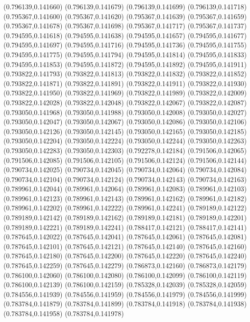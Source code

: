 (0.796139,0.141660)
(0.796139,0.141679)
(0.796139,0.141699)
(0.796139,0.141718)
(0.795367,0.141600)
(0.795367,0.141620)
(0.795367,0.141639)
(0.795367,0.141659)
(0.795367,0.141678)
(0.795367,0.141698)
(0.795367,0.141717)
(0.795367,0.141737)
(0.794595,0.141618)
(0.794595,0.141638)
(0.794595,0.141657)
(0.794595,0.141677)
(0.794595,0.141697)
(0.794595,0.141716)
(0.794595,0.141736)
(0.794595,0.141755)
(0.794595,0.141775)
(0.794595,0.141794)
(0.794595,0.141814)
(0.794595,0.141833)
(0.794595,0.141853)
(0.794595,0.141872)
(0.794595,0.141892)
(0.794595,0.141911)
(0.793822,0.141793)
(0.793822,0.141813)
(0.793822,0.141832)
(0.793822,0.141852)
(0.793822,0.141871)
(0.793822,0.141891)
(0.793822,0.141911)
(0.793822,0.141930)
(0.793822,0.141950)
(0.793822,0.141969)
(0.793822,0.141989)
(0.793822,0.142009)
(0.793822,0.142028)
(0.793822,0.142048)
(0.793822,0.142067)
(0.793822,0.142087)
(0.793050,0.141968)
(0.793050,0.141988)
(0.793050,0.142008)
(0.793050,0.142027)
(0.793050,0.142047)
(0.793050,0.142067)
(0.793050,0.142086)
(0.793050,0.142106)
(0.793050,0.142126)
(0.793050,0.142145)
(0.793050,0.142165)
(0.793050,0.142185)
(0.793050,0.142204)
(0.793050,0.142224)
(0.793050,0.142244)
(0.793050,0.142263)
(0.793050,0.142283)
(0.793050,0.142303)
(0.792278,0.142184)
(0.791506,0.142065)
(0.791506,0.142085)
(0.791506,0.142105)
(0.791506,0.142124)
(0.791506,0.142144)
(0.790734,0.142025)
(0.790734,0.142045)
(0.790734,0.142064)
(0.790734,0.142084)
(0.790734,0.142104)
(0.790734,0.142124)
(0.790734,0.142143)
(0.790734,0.142163)
(0.789961,0.142044)
(0.789961,0.142064)
(0.789961,0.142083)
(0.789961,0.142103)
(0.789961,0.142123)
(0.789961,0.142143)
(0.789961,0.142162)
(0.789961,0.142182)
(0.789961,0.142202)
(0.789961,0.142222)
(0.789961,0.142241)
(0.789189,0.142122)
(0.789189,0.142142)
(0.789189,0.142162)
(0.789189,0.142181)
(0.789189,0.142201)
(0.789189,0.142221)
(0.789189,0.142241)
(0.788417,0.142121)
(0.788417,0.142141)
(0.787645,0.142022)
(0.787645,0.142041)
(0.787645,0.142061)
(0.787645,0.142081)
(0.787645,0.142101)
(0.787645,0.142121)
(0.787645,0.142140)
(0.787645,0.142160)
(0.787645,0.142180)
(0.787645,0.142200)
(0.787645,0.142220)
(0.787645,0.142240)
(0.787645,0.142259)
(0.787645,0.142279)
(0.786873,0.142160)
(0.786873,0.142179)
(0.786100,0.142060)
(0.786100,0.142080)
(0.786100,0.142099)
(0.786100,0.142119)
(0.786100,0.142139)
(0.786100,0.142159)
(0.785328,0.142039)
(0.785328,0.142059)
(0.784556,0.141939)
(0.784556,0.141959)
(0.784556,0.141979)
(0.784556,0.141999)
(0.783784,0.141879)
(0.783784,0.141899)
(0.783784,0.141918)
(0.783784,0.141938)
(0.783784,0.141958)
(0.783784,0.141978)
